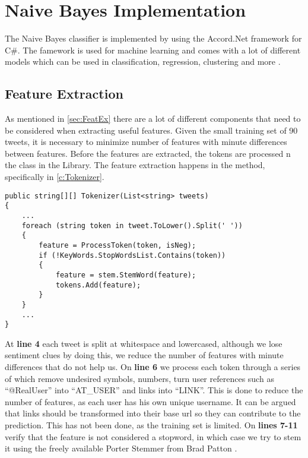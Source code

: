 \section{Naive Bayes Implementation}\label{sec:NBImp}

The Naive Bayes classifier is implemented by using the Accord.Net framework for
C\#. The famework is used for machine learning and comes with a lot of different
models which can be used in classification, regression, clustering and more
\citep{Accord}.



\subsection{Feature Extraction}
As mentioned in \autoref{sec:FeatEx} there are a lot of different components
that need to be considered when extracting useful features. Given the small
training set of 90 tweets, it is necessary to minimize number of features with
minute differences between features. Before the features are extracted, the
tokens are processed n the  class in the
 Library. The feature extraction happens in the
 method, specifically in \autoref{c:Tokenizer}.\nl

\begin{minipage}[H]{\linewidth}
\begin{lstlisting}[caption = Split and process each token in a tweet with
regexes and stemming, label = c:Tokenizer] 
public string[][] Tokenizer(List<string> tweets)
{
    ...
    foreach (string token in tweet.ToLower().Split(' '))
    {
        feature = ProcessToken(token, isNeg);
        if (!KeyWords.StopWordsList.Contains(token))
        {
        	feature = stem.StemWord(feature);
	        tokens.Add(feature);
    	}
	}
	...
}
\end{lstlisting}
\end{minipage}

At \textbf{line 4} each tweet is split at whitespace and lowercased, although we
lose sentiment clues by doing this, we reduce the number of features with
minute differences that do not help us. On \textbf{line 6} we process each
token through a series of  which remove undesired symbols,
numbers, turn user references such as ``@RealUser'' into ``AT\_USER'' and links
into ``LINK''. This is done to reduce the number of features, as each user has
his own unique username. It can be argued that links should be transformed into
their base url so they can contribute to the prediction. This has not been
done, as the training set is limited. On \textbf{lines 7-11} verify that the
feature is not considered a stopword, in which case we try to stem it using the
freely available Porter Stemmer from Brad Patton \citep{PorterStem}. 

